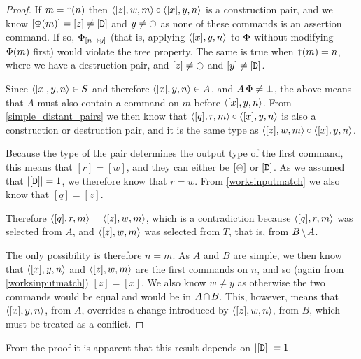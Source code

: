 \begin{proof}
If $m=\mathord{\shortuparrow}({n})$ then $\langle{[z],w,m}\rangle\mathbin{\circ}\langle{[x],y,n}\rangle$ is a construction pair, and we know
$[\Phi(m)]=[z]\neq[\mathtt{D}]$ and $y\neq\ominus$ as none of these commands is an assertion command.
If so, ${\Phi}_{[{n}\rightarrow{y}]}$ 
(that is, applying $\langle{[x],y,n}\rangle$ to $\Phi$ without modifying $\Phi(m)$ first) would violate the tree property.
The same is true when $\mathord{\shortuparrow}({m})=n$, where we have a destruction pair,
and $[z]\neq\ominus$ and $[y]\neq[\mathtt{D}]$.

Since $\langle{[x],y,n}\rangle\in S$ and therefore $\langle{[x],y,n}\rangle\in A$, and $A\,\Phi\neq\bot$,
the above means that $A$ must also contain a command on $m$ before $\langle{[x],y,n}\rangle$.
From \cref{simple_distant_pairs} we then know that $\langle{[q],r,m}\rangle\mathbin{\circ}\langle{[x],y,n}\rangle$
is also a construction or destruction pair, and it is the same type as
$\langle{[z],w,m}\rangle\mathbin{\circ}\langle{[x],y,n}\rangle$.

Because the type of the pair determines the output type of the first command,
this means that $[r]=[w]$, and they can either be $[\ominus]$ or $[\mathtt{D}]$.
As we assumed that $|[\mathtt{D}]|=1$, we therefore know that $r=w$.
From \cref{worksinputmatch} we also know that $[q]=[z]$.

Therefore $\langle{[q],r,m}\rangle = \langle{[z],w,m}\rangle$, which is a contradiction
because $\langle{[q],r,m}\rangle$ was selected from $A$, and
$\langle{[z],w,m}\rangle$ was selected from $T$, that is, from $\bmanp$.

The only possibility is therefore $n=m$.
As $A$ and $B$ are simple, we then know that
$\langle{[x],y,n}\rangle$ and $\langle{[z],w,m}\rangle$ are the first commands on $n$,
and so (again from \cref{worksinputmatch}) $[z]=[x]$.
We also know $w\neq y$ as otherwise the two commands would be equal and
would be in $\acbnp$.
This, however, means that $\langle{[x],y,n}\rangle$, from $A$, overrides a change introduced 
by $\langle{[z],w,n}\rangle$, from $B$, which must be treated as a conflict.
\end{proof}

From the proof it is apparent that this result depends on $|[\mathtt{D}]|=1$.
